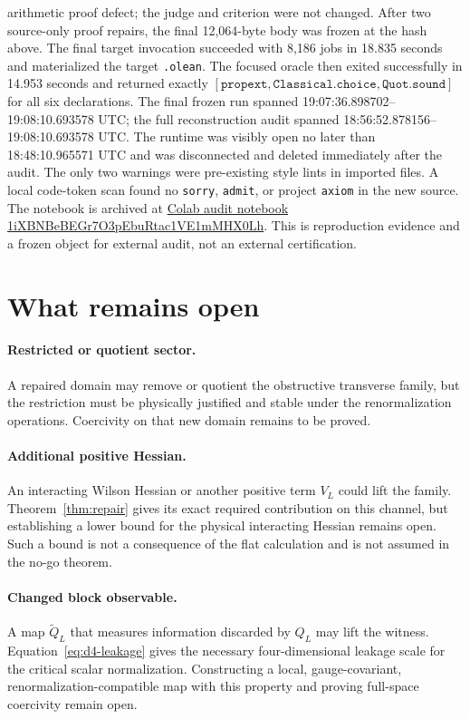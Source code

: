 \documentclass[11pt]{article}
\theoremstyle{definition}
\newcommand{\lean}[1]{\texttt{#1}}
\begin{document}
arithmetic proof defect; the judge and criterion were not changed.  After two
source-only proof repairs, the final 12,064-byte body was frozen at the hash
above.  The final target invocation succeeded with 8,186 jobs in 18.835
seconds and materialized the target \lean{.olean}.  The focused oracle then
exited successfully in 14.953 seconds and returned exactly
$[\lean{propext},\lean{Classical.choice},\lean{Quot.sound}]$ for all six
declarations.  The final frozen run spanned
19:07:36.898702--19:08:10.693578 UTC; the full reconstruction audit spanned
18:56:52.878156--19:08:10.693578 UTC.  The runtime was visibly open no later
than 18:48:10.965571 UTC and was disconnected and deleted immediately after
the audit.  The only two warnings were pre-existing style lints in imported
files.  A local code-token scan found no \lean{sorry}, \lean{admit}, or project
\lean{axiom} in the new source.  The notebook is archived at
\href{https://colab.research.google.com/drive/1iXBNBeBEGr7O3pEbuRtac1VE1mMHX0Lh}
{Colab audit notebook 1iXBNBeBEGr7O3pEbuRtac1VE1mMHX0Lh}.  This is
reproduction evidence and a frozen object for external audit, not an external
certification.

\section{What remains open}

\paragraph{Restricted or quotient sector.}
A repaired domain may remove or quotient the obstructive transverse family,
but the restriction must be physically justified and stable under the
renormalization operations.  Coercivity on that new domain remains to be
proved.

\paragraph{Additional positive Hessian.}
An interacting Wilson Hessian or another positive term $V_L$ could lift the
family.  Theorem~\ref{thm:repair} gives its exact required contribution on
this channel, but establishing a lower bound for the physical interacting
Hessian remains open.  Such a bound is not a consequence of the flat
calculation and is not assumed in the no-go theorem.

\paragraph{Changed block observable.}
A map $\widetilde Q_L$ that measures information discarded by $Q_L$ may lift
the witness.  Equation~\eqref{eq:d4-leakage} gives the necessary four-dimensional
leakage scale for the critical scalar normalization.  Constructing a local,
gauge-covariant, renormalization-compatible map with this property and proving
full-space coercivity remain open.
\end{document}
